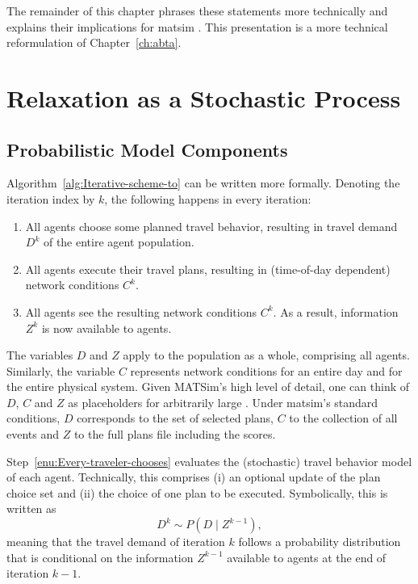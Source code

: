 The remainder of this chapter phrases these statements more technically and
explains their implications for  \gls{matsim}
.
This presentation is  a more technical reformulation
of Chapter~\ref{ch:abta}.


\section{\label{sec:Relaxation-as-a}Relaxation as a Stochastic Process}


\subsection{\label{sub:Probabilistic-model-components}Probabilistic Model Components}

Algorithm~\ref{alg:Iterative-scheme-to} can be written more formally.
Denoting the iteration index by $k$, the following happens in every
iteration:
\begin{enumerate}
\item \label{enu:Every-traveler-chooses}All agents choose some planned
travel behavior, resulting in  travel demand $D^{k}$ of the entire
agent population.
\item \label{enu:All-travelers-execute}All agents execute their travel
plans, resulting in  (time-of-day dependent) network conditions
$C^{k}$.
\item \label{enu:All-travelers-observe}All agents see the resulting network
conditions $C^{k}$. As a result,  information $Z^{k}$ is now
available to  agents.
\end{enumerate}
The variables $D$ and $Z$ apply to the population as a whole, comprising
all agents. Similarly, the variable $C$ represents network conditions
for an entire day and for the entire physical system. Given MATSim's
high level of detail, one can think of $D$, $C$ and $Z$ as
placeholders for arbitrarily large .
Under \gls{matsim}'s standard conditions, $D$ corresponds to the set of selected
plans, $C$ to the collection of all events 
and $Z$ to the full plans file including the scores.

Step~\ref{enu:Every-traveler-chooses} evaluates the (stochastic)
travel behavior model of each agent. Technically, this comprises (i)
an optional update of the plan choice set and (ii) the choice of one
plan to be executed. Symbolically, this is written as
\begin{equation}
D^{k}\sim P(D\mid Z^{k-1}),\label{eq:choice-model}
\end{equation}\corr{,}{}
meaning that 
{the travel demand of iteration $k$ follows a probability distribution
that is conditional on the information} $Z^{k-1}$
available to  agents at the end of iteration $k-1$.


